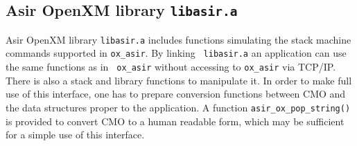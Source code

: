 \documentclass[runningheads]{cl2emult}
\begin{document}
\subsection{Asir OpenXM library {\tt libasir.a}}

Asir OpenXM library {\tt libasir.a} includes functions simulating the
stack machine commands supported in {\tt ox\_asir}.  By linking {\tt
libasir.a} an application can use the same functions as in {\tt
ox\_asir} without accessing to {\tt ox\_asir} via TCP/IP. There is
also a stack and library functions to manipulate it. In order to make
full use of this interface, one has to prepare conversion functions
between CMO and the data structures proper to the application.
A function {\tt asir\_ox\_pop\_string()} is provided to convert
CMO to a human readable form, which may be sufficient for a simple
use of this interface.
\end{document}
